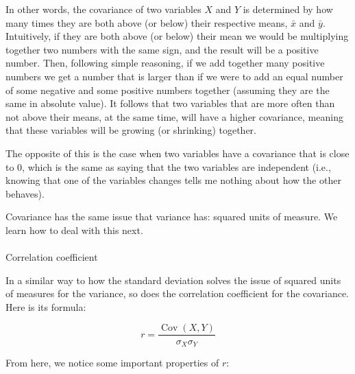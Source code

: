 \documentclass[
  letterpaper,
  DIV=11,
  numbers=noendperiod]{scrartcl}
\makeatletter
\let\oldparagraph\paragraph
\renewcommand{\paragraph}{
    \@ifstar
      \xxxParagraphStar
      \xxxParagraphNoStar
  }
\newcommand{\xxxParagraphStar}[1]{\oldparagraph*{#1}\mbox{}}
\newcommand{\xxxParagraphNoStar}[1]{\oldparagraph{#1}\mbox{}}
\makeatother
\begin{document}
In other words, the covariance of two variables \(X\) and \(Y\) is
determined by how many times they are both above (or below) their
respective means, \(\bar{x}\) and \(\bar{y}\). Intuitively, if they are
both above (or below) their mean we would be multiplying together two
numbers with the same sign, and the result will be a positive number.
Then, following simple reasoning, if we add together many positive
numbers we get a number that is larger than if we were to add an equal
number of some negative and some positive numbers together (assuming
they are the same in absolute value). It follows that two variables that
are more often than not above their means, at the same time, will have a
higher covariance, meaning that these variables will be growing (or
shrinking) together.

The opposite of this is the case when two variables have a covariance
that is close to 0, which is the same as saying that the two variables
are independent (i.e., knowing that one of the variables changes tells
me nothing about how the other behaves).

\begin{tcolorbox}[enhanced jigsaw, bottomtitle=1mm, bottomrule=.15mm, opacitybacktitle=0.6, leftrule=.75mm, title=\textcolor{quarto-callout-caution-color}{\faFire}\hspace{0.5em}{Caution}, colback=white, coltitle=black, colframe=quarto-callout-caution-color-frame, opacityback=0, colbacktitle=quarto-callout-caution-color!10!white, breakable, rightrule=.15mm, toptitle=1mm, titlerule=0mm, arc=.35mm, toprule=.15mm, left=2mm]

Covariance has the same issue that variance has: squared units of
measure. We learn how to deal with this next.

\end{tcolorbox}

\paragraph{Correlation coefficient}\label{correlation-coefficient}

In a similar way to how the standard deviation solves the issue of
squared units of measures for the variance, so does the correlation
coefficient for the covariance. Here is its formula:

\[
r = \frac{\operatorname{Cov}(X, Y)}{\sigma_X \sigma_Y}
\]

From here, we notice some important properties of \(r\):
\end{document}
